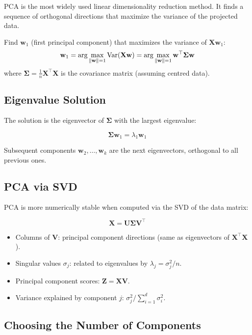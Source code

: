 PCA is the most widely used linear dimensionality reduction method. It finds a sequence of orthogonal directions that maximize the variance of the projected data.

\begin{definition}
	Find $\mathbf{w}_1$ (first principal component) that maximizes the variance of $\mathbf{X}\mathbf{w}_1$:
	\[
		\mathbf{w}_1 = \arg\max_{\|\mathbf{w}\|=1} \operatorname{Var}(\mathbf{X}\mathbf{w}) = \arg\max_{\|\mathbf{w}\|=1} \mathbf{w}^\top \boldsymbol{\Sigma} \mathbf{w}
	\]
	where $\boldsymbol{\Sigma} = \frac{1}{n} \mathbf{X}^\top \mathbf{X}$ is the covariance matrix (assuming centred data).
\end{definition}

\subsection{Eigenvalue Solution}

The solution is the eigenvector of $\boldsymbol{\Sigma}$ with the largest eigenvalue:

\[
	\boldsymbol{\Sigma} \mathbf{w}_1 = \lambda_1 \mathbf{w}_1
\]

Subsequent components $\mathbf{w}_2, \dots, \mathbf{w}_k$ are the next eigenvectors, orthogonal to all previous ones.

\subsection{PCA via SVD}

PCA is more numerically stable when computed via the SVD of the data matrix:

\[
	\mathbf{X} = \mathbf{U} \boldsymbol{\Sigma} \mathbf{V}^\top
\]

\begin{itemize}
	\item Columns of $\mathbf{V}$: principal component directions (same as eigenvectors of $\mathbf{X}^\top \mathbf{X}$).
	\item Singular values $\sigma_j$: related to eigenvalues by $\lambda_j = \sigma_j^2 / n$.
	\item Principal component scores: $\mathbf{Z} = \mathbf{X} \mathbf{V}$.
	\item Variance explained by component $j$: $\sigma_j^2 / \sum_{i=1}^d \sigma_i^2$.
\end{itemize}

\subsection{Choosing the Number of Components}


